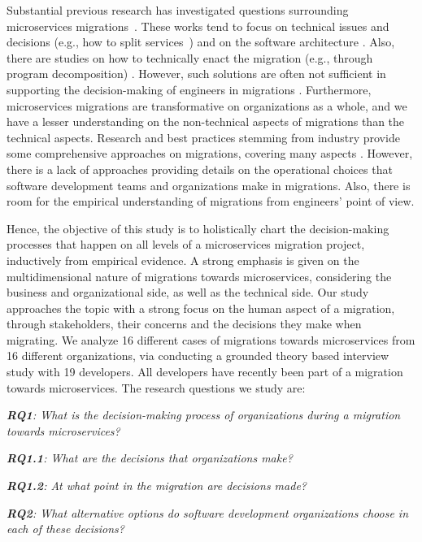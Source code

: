 \documentclass[sigconf,dvipsnames]{acmart}
\begin{document}
Substantial previous research has investigated questions surrounding microservices migrations~\cite{Balalaie2018, Fritzsch2019}. These works tend to focus on technical issues and decisions (e.g., how to split services~\cite{Gysel2016, Zhongshan2018}) and on the software architecture \cite{Taibi2017}. Also, there are studies on how to technically enact the migration (e.g., through program decomposition) \cite{fritzsch2018monolith}. However, such solutions are often not sufficient in supporting the decision-making of engineers in migrations \cite{Carvalho2019}. 
Furthermore, microservices migrations are transformative on organizations as a whole, and we have a lesser understanding on the non-technical aspects of migrations than the technical aspects. 
Research and best practices stemming from industry provide some comprehensive approaches on migrations, covering many aspects \cite{newman2019monolith, Balalaie2016}. However, there is a lack of approaches providing details on the operational choices that software development teams and organizations make in migrations. Also, there is room for the empirical understanding of migrations from engineers' point of view. 

Hence, the objective of this study is to holistically chart the decision-making processes that happen on all levels of a microservices migration project, inductively from empirical evidence. 
A strong emphasis is given on the multidimensional nature of migrations towards microservices, considering the business and organizational side, as well as the technical side. 
Our study approaches the topic with a strong focus on the human aspect of a migration, through stakeholders, their concerns and the decisions they make when migrating. 
We analyze 16 different cases of migrations towards microservices from 16 different organizations, via conducting a grounded theory based interview study with 19 developers. All developers have recently been part of a migration towards microservices.
The research questions we study are: 

\vspace{0.2cm}
\noindent \emph{\textbf{RQ1}: What is the decision-making process of organizations during a migration towards microservices?} 
\begin{description}
    \item \emph{\textbf{RQ1.1}: What are the decisions that organizations make?}
    \item \emph{\textbf{RQ1.2}: At what point in the migration are decisions made?}
\end{description}
\emph{\textbf{RQ2}: What alternative options do software development organizations choose in each of these decisions?} 
\vspace{0.2cm}
\end{document}
